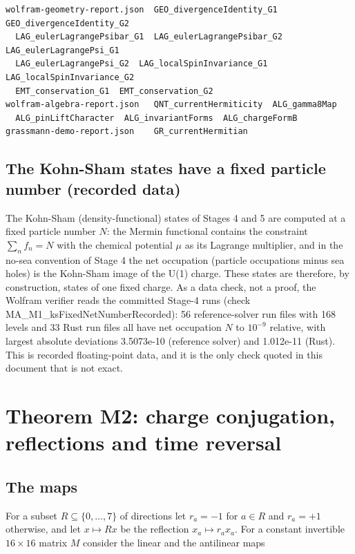 \documentclass[11pt]{article}
\begin{document}
\begin{Verbatim}[fontsize=\small]
wolfram-geometry-report.json  GEO_divergenceIdentity_G1  GEO_divergenceIdentity_G2
  LAG_eulerLagrangePsibar_G1  LAG_eulerLagrangePsibar_G2  LAG_eulerLagrangePsi_G1
  LAG_eulerLagrangePsi_G2  LAG_localSpinInvariance_G1  LAG_localSpinInvariance_G2
  EMT_conservation_G1  EMT_conservation_G2
wolfram-algebra-report.json   QNT_currentHermiticity  ALG_gamma8Map
  ALG_pinLiftCharacter  ALG_invariantForms  ALG_chargeFormB
grassmann-demo-report.json    GR_currentHermitian
\end{Verbatim}

\subsection{The Kohn-Sham states have a fixed particle number (recorded data)}

The Kohn-Sham (density-functional) states of Stages 4 and 5 are computed at a fixed particle number $N$: the Mermin functional contains the constraint $\sum_nf_n=N$ with the chemical potential $\mu$ as its Lagrange multiplier, and in the no-sea convention of Stage 4 the net occupation (particle occupations minus sea holes) is the Kohn-Sham image of the U(1) charge. These states are therefore, by construction, states of one fixed charge. As a data check, not a proof, the Wolfram verifier reads the committed Stage-4 runs (check MA\_M1\_ksFixedNetNumberRecorded): 56 reference-solver run files with 168 levels and 33 Rust run files all have net occupation $N$ to $10^{-9}$ relative, with largest absolute deviations 3.5073e-10 (reference solver) and 1.012e-11 (Rust). This is recorded floating-point data, and it is the only check quoted in this document that is not exact.

\section{Theorem M2: charge conjugation, reflections and time reversal}

\subsection{The maps}

For a subset $R\subseteq\{0,\dots,7\}$ of directions let $r_a=-1$ for $a\in R$ and $r_a=+1$ otherwise, and let $x\mapsto Rx$ be the reflection $x_a\mapsto r_ax_a$. For a constant invertible $16\times16$ matrix $M$ consider the linear and the antilinear maps
\end{document}
